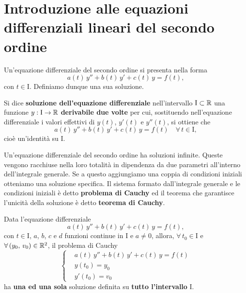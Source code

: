 \documentclass[../../analisi2]{subfiles}
\begin{document}
    \chapter{Introduzione alle equazioni differenziali lineari del secondo ordine}

        Un'equazione differenziale del secondo ordine si presenta nella forma
        \[
            a(t) \, y'' + b(t) \, y' + c(t) \, y = f(t),
        \]
        con \(t \in \mathrm{I}\). Definiamo dunque una sua soluzione.

        \begin{definizione}
            Si dice \textbf{soluzione dell'equazione differenziale} nell'intervallo \(\mathrm{I} \subset \mathbb{R}\) una funzione
            \(y : \mathrm{I} \to \mathbb{R}\) \textbf{derivabile due volte} per cui, sostituendo nell'equazione differenziale i valori effettivi
            di \(y(t)\), \(y'(t)\) e \(y''(t)\), si ottiene che
            \[
                a(t) \, y'' + b(t) \, y' + c(t) \, y = f(t) \quad \forall \, t \in \mathrm{I},
            \] cioè un'identità su \(\mathrm{I}\).
        \end{definizione}

        Un'equazione differenziale del secondo ordine ha soluzioni infinite. Queste vengono racchiuse nella loro totalità
        in dipendenza da due parametri all'interno dell'integrale generale. Se a questo aggiungiamo una coppia di condizioni iniziali
        otteniamo una soluzione specifica. Il sistema formato dall'integrale generale e le condizioni iniziali è detto
        \textbf{problema di Cauchy} ed il teorema che garantisce l'unicità della soluzione è detto \textbf{teorema di Cauchy}.

        \begin{teorema}
            Data l'equazione differenziale
            \[
                a(t) \, y'' + b(t) \, y' + c(t) \, y = f(t),
            \]
            con \(t \in \mathrm{I}\), \(a\), \(b\), \(c\) e \(d\) funzioni continue in \(\mathrm{I}\) e \(a \neq 0\), allora,
            \(\forall \, t_0 \in \mathrm{I}\) e \(\forall \, (y_0, \, v_0) \in \mathbb{R}^2\), il problema di Cauchy
            \[
                \left\{
                    \begin{aligned}
                        &a(t) \, y'' + b(t) \, y' + c(t) \, y = f(t)\\
                        &y(t_0) = y_0\\
                        &y'(t_0) = v_0
                    \end{aligned}
                \right.
            \]
            ha \textbf{una ed una sola} soluzione definita su \textbf{tutto l'intervallo} \(\mathrm{I}\).
        \end{teorema}
\end{document}
